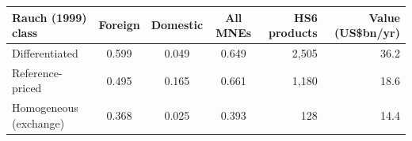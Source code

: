 \begin{tabular}{lcccrr}
\toprule
Rauch (1999) class & Foreign & Domestic & All MNEs & HS6 products & Value (US\$bn/yr) \\
\midrule
Differentiated & 0.599 & 0.049 & 0.649 & 2,505 & 36.2 \\
Reference-priced & 0.495 & 0.165 & 0.661 & 1,180 & 18.6 \\
Homogeneous (exchange) & 0.368 & 0.025 & 0.393 & 128 & 14.4 \\
\bottomrule
\end{tabular}
